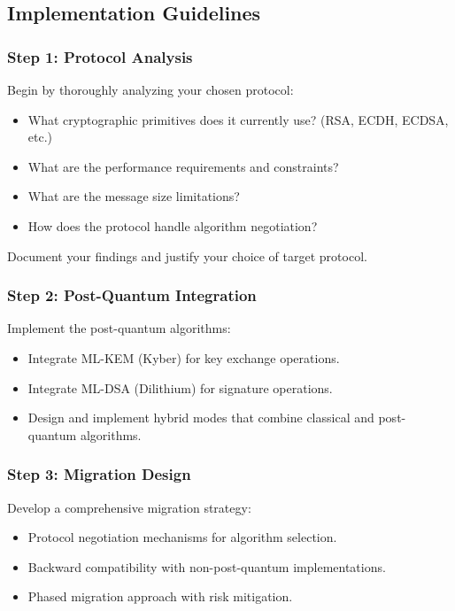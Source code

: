 \documentclass[10pt,a4paper,american]{exam}
\begin{document}
\subsection*{Implementation Guidelines}

\subsubsection*{Step 1: Protocol Analysis}
Begin by thoroughly analyzing your chosen protocol:
\begin{itemize}
	\item What cryptographic primitives does it currently use? (RSA, ECDH, ECDSA, etc.)
	\item What are the performance requirements and constraints?
	\item What are the message size limitations?
	\item How does the protocol handle algorithm negotiation?
\end{itemize}

Document your findings and justify your choice of target protocol.

\subsubsection*{Step 2: Post-Quantum Integration}
Implement the post-quantum algorithms:
\begin{itemize}
	\item Integrate ML-KEM (Kyber) for key exchange operations.
	\item Integrate ML-DSA (Dilithium) for signature operations.
	\item Design and implement hybrid modes that combine classical and post-quantum algorithms.
\end{itemize}

\subsubsection*{Step 3: Migration Design}
Develop a comprehensive migration strategy:
\begin{itemize}
	\item Protocol negotiation mechanisms for algorithm selection.
	\item Backward compatibility with non-post-quantum implementations.
	\item Phased migration approach with risk mitigation.
\end{itemize}
\end{document}
